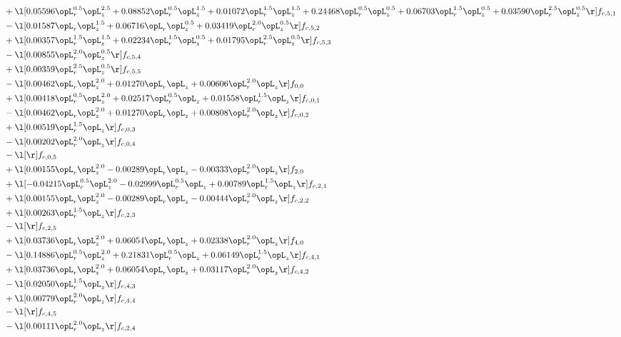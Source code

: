 \begin{alignat}{2}
& + \l[  0.05596 \opL_r^{0.5} \opL_z^{2.5} +  0.08852 \opL_r^{0.5} \opL_z^{1.5} +  0.01072 \opL_r^{1.5} \opL_z^{1.5} +  0.24468 \opL_r^{0.5} \opL_z^{0.5} +  0.06703 \opL_r^{1.5} \opL_z^{0.5} +  0.03590 \opL_r^{2.5} \opL_z^{0.5}  \r] f_{c,5,1} \nonumber \\ 
& - \l[  0.01587 \opL_r \opL_z^{1.5} +  0.06716 \opL_r \opL_z^{0.5} +  0.03419 \opL_r^{2.0} \opL_z^{0.5}  \r] f_{c,5,2} \nonumber \\ 
& + \l[  0.00357 \opL_r^{1.5} \opL_z^{1.5} +  0.02234 \opL_r^{1.5} \opL_z^{0.5} +  0.01795 \opL_r^{2.5} \opL_z^{0.5}  \r] f_{c,5,3} \nonumber \\ 
& - \l[  0.00855 \opL_r^{2.0} \opL_z^{0.5}  \r] f_{c,5,4} \nonumber \\ 
& + \l[  0.00359 \opL_r^{2.5} \opL_z^{0.5}  \r] f_{c,5,5} \nonumber \\ 
& - \l[  0.00462 \opL_r \opL_z^{2.0} +  0.01270 \opL_r \opL_z +  0.00606 \opL_r^{2.0} \opL_z  \r] f_{0,0} \nonumber \\ 
& + \l[  0.00418 \opL_r^{0.5} \opL_z^{2.0} +  0.02517 \opL_r^{0.5} \opL_z +  0.01558 \opL_r^{1.5} \opL_z  \r] f_{c,0,1} \nonumber \\ 
& - \l[  0.00462 \opL_r \opL_z^{2.0} +  0.01270 \opL_r \opL_z +  0.00808 \opL_r^{2.0} \opL_z  \r] f_{c,0,2} \nonumber \\ 
& + \l[  0.00519 \opL_r^{1.5} \opL_z  \r] f_{c,0,3} \nonumber \\ 
& - \l[  0.00202 \opL_r^{2.0} \opL_z  \r] f_{c,0,4} \nonumber \\ 
& - \l[  \r] f_{c,0,5} \nonumber \\ 
& + \l[  0.00155 \opL_r \opL_z^{2.0}   -0.00289 \opL_r \opL_z   -0.00333 \opL_r^{2.0} \opL_z  \r] f_{2,0} \nonumber \\ 
& + \l[  -0.04215 \opL_r^{0.5} \opL_z^{2.0}   -0.02999 \opL_r^{0.5} \opL_z +  0.00789 \opL_r^{1.5} \opL_z  \r] f_{c,2,1} \nonumber \\ 
& + \l[  0.00155 \opL_r \opL_z^{2.0}   -0.00289 \opL_r \opL_z   -0.00444 \opL_r^{2.0} \opL_z  \r] f_{c,2,2} \nonumber \\ 
& + \l[  0.00263 \opL_r^{1.5} \opL_z  \r] f_{c,2,3} \nonumber \\ 
& - \l[  \r] f_{c,2,5} \nonumber \\ 
& + \l[  0.03736 \opL_r \opL_z^{2.0} +  0.06054 \opL_r \opL_z +  0.02338 \opL_r^{2.0} \opL_z  \r] f_{4,0} \nonumber \\ 
& - \l[  0.14886 \opL_r^{0.5} \opL_z^{2.0} +  0.21831 \opL_r^{0.5} \opL_z +  0.06149 \opL_r^{1.5} \opL_z  \r] f_{c,4,1} \nonumber \\ 
& + \l[  0.03736 \opL_r \opL_z^{2.0} +  0.06054 \opL_r \opL_z +  0.03117 \opL_r^{2.0} \opL_z  \r] f_{c,4,2} \nonumber \\ 
& - \l[  0.02050 \opL_r^{1.5} \opL_z  \r] f_{c,4,3} \nonumber \\ 
& + \l[  0.00779 \opL_r^{2.0} \opL_z  \r] f_{c,4,4} \nonumber \\ 
& - \l[  \r] f_{c,4,5} \nonumber \\ 
& - \l[  0.00111 \opL_r^{2.0} \opL_z  \r] f_{c,2,4} \nonumber \\ 
\end{alignat} 


